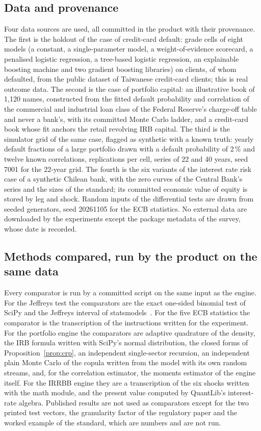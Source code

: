 \subsection{Data and provenance}

Four data sources are used, all committed in the product with their provenance. The first is the holdout of the case of credit-card default: \cCells{} grade cells of eight models (a constant, a single-parameter model, a weight-of-evidence scorecard, a penalised logistic regression, a tree-based logistic regression, an explainable boosting machine and two gradient boosting libraries) on \holdN{} clients, \holdD{} of whom defaulted, from the public dataset of Taiwanese credit-card clients; this is real outcome data. The second is the case of portfolio capital: an illustrative book of 1,120 names, constructed from the fitted default probability and correlation of the commercial and industrial loan class of the Federal Reserve's charge-off table and never a bank's, with its committed Monte Carlo ladder, and a credit-card book whose fit anchors the retail revolving IRB capital. The third is the simulator grid of the same case, flagged as synthetic with a known truth: yearly default fractions of a large portfolio drawn with a default probability of 2\,\% and twelve known correlations, \gridReps{} replications per cell, series of 22 and 40 years, seed 7001 for the 22-year grid. The fourth is the six variants of the interest rate risk case of a synthetic Chilean bank, with the zero curves of the Central Bank's series and the sizes of the standard; its committed economic value of equity is stored by leg and shock. Random inputs of the differential tests are drawn from seeded generators, seed 20261105 for the ECB statistics. No external data are downloaded by the experiments except the package metadata of the survey, whose date is recorded.

\subsection{Methods compared, run by the product on the same data}

Every comparator is run by a committed script on the same input as the engine. For the Jeffreys test the comparators are the exact one-sided binomial test of SciPy and the Jeffreys interval of statsmodels~\citep{virtanen2020,seabold2010}. For the five ECB statistics the comparator is the transcription of the instructions written for the experiment. For the portfolio engine the comparators are adaptive quadrature of the density, the IRB formula written with SciPy's normal distribution, the closed forms of Proposition~\ref{prop:crp}, an independent single-sector recursion, an independent plain Monte Carlo of the copula written from the model with its own random streams, and, for the correlation estimator, the moments estimator of the engine itself. For the IRRBB engine they are a transcription of the six shocks written with the math module, and the present value computed by QuantLib's interest-rate algebra. Published results are not used as comparators except for the two printed test vectors, the granularity factor of the regulatory paper and the worked example of the standard, which are numbers and are not run.

